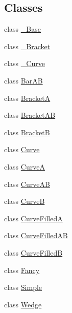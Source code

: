 \subsection*{Classes}
\begin{DoxyCompactItemize}
\item 
class \hyperlink{classmatplotlib_1_1patches_1_1ArrowStyle_1_1__Base}{\+\_\+\+Base}
\item 
class \hyperlink{classmatplotlib_1_1patches_1_1ArrowStyle_1_1__Bracket}{\+\_\+\+Bracket}
\item 
class \hyperlink{classmatplotlib_1_1patches_1_1ArrowStyle_1_1__Curve}{\+\_\+\+Curve}
\item 
class \hyperlink{classmatplotlib_1_1patches_1_1ArrowStyle_1_1BarAB}{Bar\+AB}
\item 
class \hyperlink{classmatplotlib_1_1patches_1_1ArrowStyle_1_1BracketA}{BracketA}
\item 
class \hyperlink{classmatplotlib_1_1patches_1_1ArrowStyle_1_1BracketAB}{Bracket\+AB}
\item 
class \hyperlink{classmatplotlib_1_1patches_1_1ArrowStyle_1_1BracketB}{BracketB}
\item 
class \hyperlink{classmatplotlib_1_1patches_1_1ArrowStyle_1_1Curve}{Curve}
\item 
class \hyperlink{classmatplotlib_1_1patches_1_1ArrowStyle_1_1CurveA}{CurveA}
\item 
class \hyperlink{classmatplotlib_1_1patches_1_1ArrowStyle_1_1CurveAB}{Curve\+AB}
\item 
class \hyperlink{classmatplotlib_1_1patches_1_1ArrowStyle_1_1CurveB}{CurveB}
\item 
class \hyperlink{classmatplotlib_1_1patches_1_1ArrowStyle_1_1CurveFilledA}{Curve\+FilledA}
\item 
class \hyperlink{classmatplotlib_1_1patches_1_1ArrowStyle_1_1CurveFilledAB}{Curve\+Filled\+AB}
\item 
class \hyperlink{classmatplotlib_1_1patches_1_1ArrowStyle_1_1CurveFilledB}{Curve\+FilledB}
\item 
class \hyperlink{classmatplotlib_1_1patches_1_1ArrowStyle_1_1Fancy}{Fancy}
\item 
class \hyperlink{classmatplotlib_1_1patches_1_1ArrowStyle_1_1Simple}{Simple}
\item 
class \hyperlink{classmatplotlib_1_1patches_1_1ArrowStyle_1_1Wedge}{Wedge}
\end{DoxyCompactItemize}
